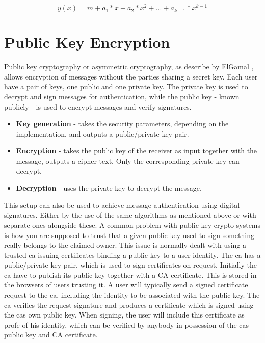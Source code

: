 \begin{equation}
 y(x) = m + a_1*x + a_2*x^2 + ... + a_{k-1} * x^{k-1} 
\end{equation}\label{eq:polynom}


\section{Public Key Encryption}\label{sec:pke}
Public key cryptography or asymmetric cryptography, as describe by ElGamal \cite{elgamal},  allows encryption of messages without the parties sharing a secret key. Each user have a pair of keys, one public and one private key. The private key is used to decrypt and sign messages for authentication, while the public key - known publicly - is used to encrypt messages and verify signatures. 
\begin{itemize}
\item \textbf{Key generation} - takes the security parameters, depending on the implementation, and outputs a public/private key pair.
\item \textbf{ Encryption } - takes the public key of the receiver as input together with the message, outputs a cipher text. Only the corresponding private key can decrypt.
\item \textbf{ Decryption } - uses the private key to decrypt the message.
\end{itemize}

This setup can also be used to achieve message authentication using digital signatures. Either by the use of the same algorithms as mentioned above or with separate ones alongside these. A common problem with public key crypto systems is how you are supposed to trust that a given public key used to sign something really belongs to the claimed owner. This issue is normally dealt with using a trusted \gls{ca} issuing certificates binding a public key to a user identity. The \gls{ca} has a public/private key pair, which is used to sign certificates on request. Initially the \gls{ca} have to publish its public key together with a CA certificate. This is stored in the browsers of users trusting it. A user will typically send a signed certificate request to the \gls{ca}, including the identity to be associated with the public key. The \gls{ca} verifies the request signature and produces a certificate which is signed using the \glspl{ca} own public key. When signing, the user will include this certificate as profe of his identity, which can be verified by anybody in possession of the \glspl{ca} public key and CA certificate. 




